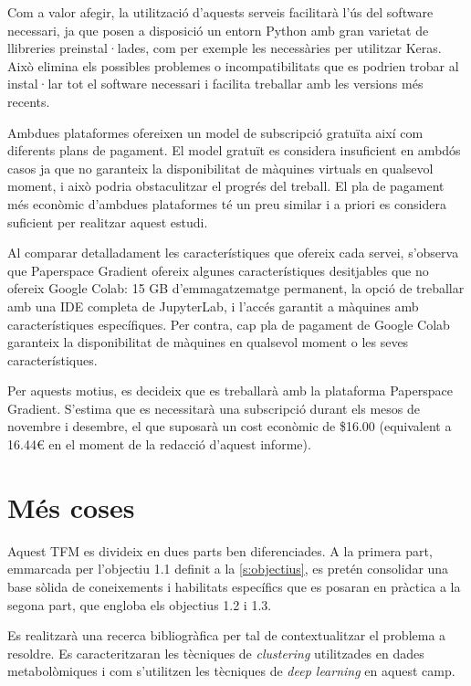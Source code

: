 \documentclass[CAT,BIB]{TFUOC}%
\begin{document}
            Com a valor afegir, la utilització d'aquests serveis facilitarà l'ús del software necessari, ja que posen a disposició un entorn Python amb gran varietat de llibreries preinstal·lades, com per exemple les necessàries per utilitzar Keras. Això elimina els possibles problemes o incompatibilitats que es podrien trobar al instal·lar tot el software necessari i facilita treballar amb les versions més recents.

            Ambdues plataformes ofereixen un model de subscripció gratuïta així com diferents plans de pagament. El model gratuït es considera insuficient en ambdós casos ja que no garanteix la disponibilitat de màquines virtuals en qualsevol moment, i això podria obstaculitzar el progrés del treball. El pla de pagament més econòmic d'ambdues plataformes té un preu similar i a priori es considera suficient per realitzar aquest estudi.

            Al comparar detalladament les característiques que ofereix cada servei, s'observa que Paperspace Gradient ofereix algunes característiques desitjables que no ofereix Google Colab: 15 GB d'emmagatzematge permanent, la opció de treballar amb una IDE completa de JupyterLab, i l'accés garantit a màquines amb característiques específiques. Per contra, cap pla de pagament de Google Colab garanteix la disponibilitat de màquines en qualsevol moment o les seves característiques.

            Per aquests motius, es decideix que es treballarà amb la plataforma Paperspace Gradient. S'estima que es necessitarà una subscripció durant els mesos de novembre i desembre, el que suposarà un cost econòmic de \$16.00 (equivalent a 16.44€ en el moment de la redacció d'aquest informe).

    \section{Més coses}
    \label{s:mes}

    Aquest TFM es divideix en dues parts ben diferenciades. A la primera part, emmarcada per l'objectiu 1.1 definit a la \cref{s:objectius}, es pretén consolidar una base sòlida de coneixements i habilitats específics que es posaran en pràctica a la segona part, que engloba els objectius 1.2 i 1.3.

    Es realitzarà una recerca bibliogràfica per tal de contextualitzar el problema a resoldre. Es caracteritzaran les tècniques de \textit{clustering} utilitzades en dades metabolòmiques i com s'utilitzen les tècniques de \textit{deep learning} en aquest camp.
\end{document}
